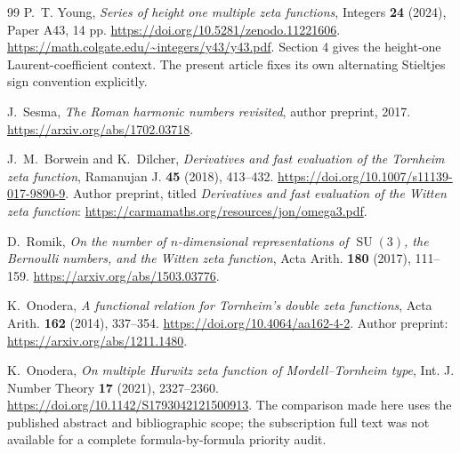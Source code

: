 \documentclass[11pt,a4paper]{article}
\numberwithin{equation}{section}
\theoremstyle{plain}
\theoremstyle{definition}
\theoremstyle{remark}
\begin{document}
\begin{thebibliography}{99}
P.~T. Young,
\emph{Series of height one multiple zeta functions},
Integers \textbf{24} (2024), Paper A43, 14 pp.
\url{https://doi.org/10.5281/zenodo.11221606}.
\url{https://math.colgate.edu/~integers/y43/y43.pdf}.
Section 4 gives the height-one Laurent-coefficient context. The present
article fixes its own alternating Stieltjes sign convention explicitly.

J.~Sesma,
\emph{The Roman harmonic numbers revisited}, author preprint, 2017.
\url{https://arxiv.org/abs/1702.03718}.

J.~M.~Borwein and K.~Dilcher,
\emph{Derivatives and fast evaluation of the Tornheim zeta function},
Ramanujan J. \textbf{45} (2018), 413--432.
\url{https://doi.org/10.1007/s11139-017-9890-9}.
Author preprint, titled \emph{Derivatives and fast evaluation of the
Witten zeta function}:
\url{https://carmamaths.org/resources/jon/omega3.pdf}.

D.~Romik,
\emph{On the number of $n$-dimensional representations of
$\operatorname{SU}(3)$, the Bernoulli numbers, and the Witten zeta
function}, Acta Arith. \textbf{180} (2017), 111--159.
\url{https://arxiv.org/abs/1503.03776}.

K.~Onodera,
\emph{A functional relation for Tornheim's double zeta functions},
Acta Arith. \textbf{162} (2014), 337--354.
\url{https://doi.org/10.4064/aa162-4-2}.
Author preprint: \url{https://arxiv.org/abs/1211.1480}.

K.~Onodera,
\emph{On multiple Hurwitz zeta function of Mordell--Tornheim type},
Int. J. Number Theory \textbf{17} (2021), 2327--2360.
\url{https://doi.org/10.1142/S1793042121500913}.
The comparison made here uses the published abstract and bibliographic
scope; the subscription full text was not available for a complete
formula-by-formula priority audit.

\end{thebibliography}

\end{document}
